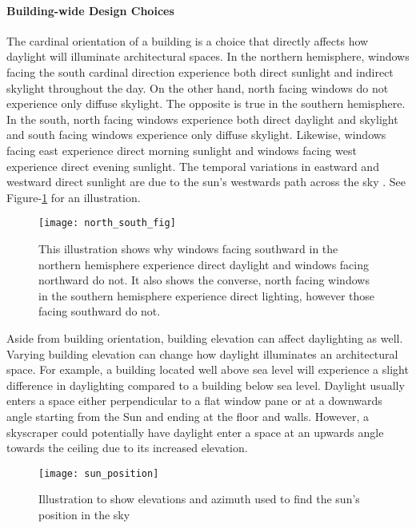 \paragraph{Building-wide Design Choices} 
The cardinal orientation of a building is a choice that directly affects how daylight will illuminate architectural spaces. In the northern hemisphere, windows facing the south cardinal direction experience both direct sunlight and indirect skylight throughout the day. On the other hand, north facing windows do not experience only diffuse skylight. The opposite is true in the southern hemisphere. In the south, north facing windows experience both direct daylight and skylight and south facing windows experience only diffuse skylight. Likewise, windows facing east experience direct morning sunlight and windows facing west experience direct evening sunlight. The temporal variations in eastward and westward direct sunlight are due to the sun's westwards path across the sky \cite{Robbins}. See Figure-\ref{fig:north_south} for an illustration.  \\

\begin{figure}[h]
\centering
\texttt{[image: north\_south\_fig]}
\caption[Illustration of why southern facing windows experience direct daylight in the northern hemisphere.]{This illustration shows why windows facing southward in the northern hemisphere experience direct daylight and windows facing northward do not. It also shows the converse, north facing windows in the southern hemisphere experience direct lighting, however those facing southward do not.} 
\label{fig:north_south}
\end{figure}

Aside from building orientation, building elevation can affect daylighting as well. Varying building elevation can change how daylight illuminates an architectural space. For example, a building located well above sea level will experience a slight difference in daylighting compared to a building below sea level. Daylight usually enters a space either perpendicular to a flat window pane or at a downwards angle starting from the Sun and ending at the floor and walls. However, a skyscraper could potentially have daylight enter a space at an upwards angle towards the ceiling due to its increased elevation.\\

\begin{figure}[h]
\centering
\texttt{[image: sun\_position]}
\caption{Illustration to show elevations and azimuth used to find the sun's position in the sky} 
\label{fig:sun_position}
\end{figure}

